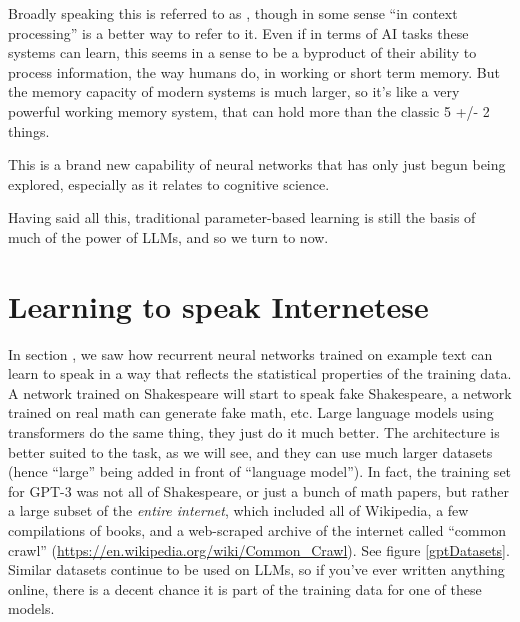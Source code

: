 Broadly speaking this is referred to as , though in some sense ``in context processing'' is a better way to refer to it. Even if in terms of AI tasks these systems can learn, this seems in a sense to be a byproduct of their ability to process information, the way humans do, in working or short term memory. But the memory capacity of modern systems is much larger, so it's like a very powerful working memory system, that can hold more than the classic 5 +/- 2 things.  

This is a brand new capability of neural networks that has only just begun being explored, especially as it relates to cognitive science.

Having said all this, traditional parameter-based learning is still the basis of much of the power of LLMs, and so we turn to now.

\section{Learning to speak Internetese}\label{internetese}

In section , we saw how recurrent neural networks trained on example text can learn to speak in a way that reflects the statistical properties of the training data. A network trained on Shakespeare will start to speak fake Shakespeare, a network trained on real math can generate fake math, etc. Large language models using transformers do the same thing, they just do it much better. The architecture is better suited to the task, as we will see, and they can use much larger datasets (hence ``large'' being added in front of ``language model''). In fact, the training set for GPT-3 was not all of Shakespeare, or just a bunch of math papers, but rather a large subset of the \emph{entire internet}, which included all of Wikipedia, a few compilations of books, and a web-scraped archive of the internet called ``common crawl'' (\url{https://en.wikipedia.org/wiki/Common_Crawl}). See figure \ref{gptDatasets}. Similar datasets continue to be used on LLMs, so if you've ever written anything online, there is a decent chance it is part of the training data for one of these models. 

